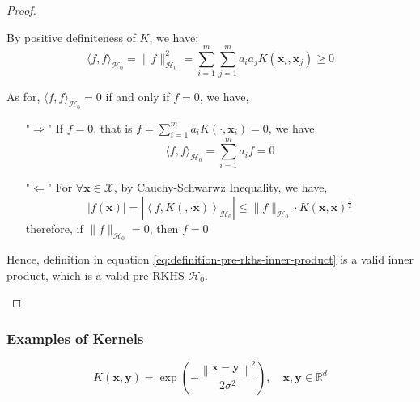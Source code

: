 \begin{proof}
\begin{enumerate}
\begin{enumerate}
                        By positive definiteness of $K$, we have:
                        \begin{equation*}
                            \langle f,f\rangle_{\mathcal{H}_{0}}=\|f\|_{\mathcal{H}_{0}}^{2}=\sum_{i=1}^{m}\sum_{j=1}^{m}a_{i}a_{j}K\left(\mathbf{x}_{i},\mathbf{x}_{j}\right)\geq 0
                        \end{equation*}

                        As for, $\langle f,f\rangle_{\mathcal{H}_{0}}=0$ if and only if $f=0$, we have,
                        \begin{itemize}
                            \item["$\Rightarrow$"] If $f=0$, that is $f=\sum_{i=1}^{m}a_{i}K\left(\cdot,\mathbf{x}_{i}\right)=0$, we have
                                \begin{equation*}
                                    \langle f,f\rangle_{\mathcal{H}_{0}}=\sum_{i=1}^{m}a_{i}f=0
                                \end{equation*}
                            \item["$\Leftarrow$"] For $\forall\mathbf{x}\in\mathcal{X}$, by Cauchy-Schwarwz Inequality, we have,
                                \begin{equation*}
                                    |f(\mathbf{x})|=\left|\left\langle f,K\left(,\cdot{\mathbf{x}}\right)\right\rangle_{\mathcal{H}_{0}}\right|\leq\|f\|_{\mathcal{H}_{0}}\cdot K\left(\mathbf{x},\mathbf{x}\right)^{\frac{1}{2}}
                                \end{equation*}
                                therefore, if $\|f\|_{\mathcal{H}_{0}}=0$, then $f=0$
                        \end{itemize}
              \end{enumerate}
              Hence, definition in equation \ref{eq:definition-pre-rkhs-inner-product} is a valid inner product, which is a valid pre-RKHS $\mathcal{H}_{0}$.
    \end{enumerate}
\end{proof}

\subsubsection{Examples of Kernels}

\begin{example}
    \begin{equation}
        K(\mathbf{x},\mathbf{y})=\exp\left(-\frac{\left\|\mathbf{x}-\mathbf{y}\right\|^{2}}{2\sigma^{2}}\right),\quad\mathbf{x},\mathbf{y}\in\mathbb{R}^{d}
    \end{equation}
\end{example}

